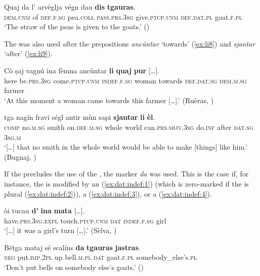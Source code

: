 \ea\label{ex:li7}
\gll Quaj da l’ arvèglja végn dau \textbf{dis} \textbf{tgauras}.  \\
\textsc{dem.unm} of \textsc{def.f.sg} pea.\textsc{coll} \textsc{pass.prs.3sg} give.\textsc{ptcp.unm} \textsc{def.dat.pl} goat.\textsc{f.pl} \\
\glt `The straw of the peas is given to the goats.' ()
\z

The  was also used after the prepositions \textit{ancúntar} `towards' (\ref{ex:li8}) and \textit{sjantar} `after' (\ref{ex:li9}).

\ea\label{ex:li8}
\gll  Cò ṣaj vagnú ina	fèmna ancùntar \textbf{li} \textbf{quaj} \textbf{pur} […].\\
here be.\textsc{prs}.3\textsc{sg}  come.\textsc{ptcp.unm}	\textsc{indef.f.sg} woman towards	\textsc{def.dat.sg} \textsc{dem.m.sg} farmer\\
\glt `At this moment a woman came towards this farmer […].' (Ruèras, \citealt[64]{Büchli1966})
\z

\ea\label{ex:li9}
\gll   […] tga nagín fravi ségl antir mùn sapi  \textbf{sjantar} \textbf{li} \textbf{èl}. \\
{}  \textsc{comp} no.\textsc{m.sg} smith on.\textsc{def.m.sg} whole world can.\textsc{prs.sbjv.3sg} do.\textsc{inf} after \textsc{dat.sg} \textsc{3sg.m}\\
\glt `[…] that no smith in the whole world would be able to make [things] like him.' (Bugnaj, \citealt[146]{Büchli1966})
\z

If the  precludes the use of the , the marker \textit{da} was used. This is the case if, for instance, the  is modified by an  (\ref{ex:dat:indef:1}) (which is zero-marked if the  is plural (\ref{ex:dat:indef:2})), a  (\ref{ex:dat:indef:3}), or a  (\ref{ex:dat:indef:4}).

\ea\label{ex:dat:indef:1}
\gll […] òi tucau \textbf{d'} \textbf{ina} \textbf{mata} […].\\
{} have.\textsc{prs.3sg.expl} touch.\textsc{ptcp.unm} \textsc{dat} \textsc{indef.f.sg} girl \\
\glt `[…] it was a girl's turn […].' (Sèlva, \citealt[25]{Büchli1966})
\z

\ea\label{ex:dat:indef:2}
\gll Bétga mataj sé scalíns \textbf{da} \textbf{tgauras} \textbf{jastras}.\\
\textsc{neg} put.\textsc{imp.2pl} up bell.\textsc{m.pl} \textsc{dat} goat.\textsc{f.pl} somebody\_else’s.\textsc{pl}\\
\glt `Don’t put bells on somebody else’s goats.' (\citealt[118]{Berther1998})
\z

